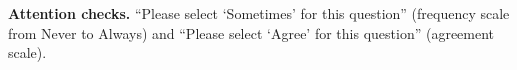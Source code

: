 \documentclass[conference,compsoc]{IEEEtran}
\begin{document}
\textbf{Attention checks.} ``Please select `Sometimes' for this question''
(frequency scale from Never to Always) and ``Please select `Agree' for
this question'' (agreement scale).







\end{document}
